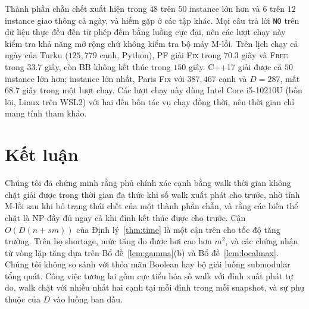 \documentclass[pdflatex,sn-mathphys-num]{sn-jnl}
\theoremstyle{thmstyleone}
\theoremstyle{thmstyletwo}
\theoremstyle{thmstylethree}
\newcommand{\FIX}{\textup{\textsc{Fix}}}
\newcommand{\FREE}{\textup{\textsc{Free}}}
\newcommand{\NO}{\texttt{NO}}
\begin{document}
Thành phần chẵn chết xuất hiện trong $48$ trên $50$ instance lớn hơn và $6$ trên $12$ instance giao thông cả ngày, và hiếm gặp ở các tập khác. Mọi câu trả lời \NO{} trên dữ liệu thực đều đến từ phép đếm bằng luồng cực đại, nên các lượt chạy này kiểm tra khả năng mở rộng chứ không kiểm tra bộ máy M-lồi. Trên lịch chạy cả ngày của Turku ($125{,}779$ cạnh, Python), PF giải \FIX{} trong $70.3$ giây và \FREE{} trong $33.7$ giây, còn BB không kết thúc trong $150$ giây. C++17 giải được cả $50$ instance lớn hơn; instance lớn nhất, Paris \FIX{} với $387{,}467$ cạnh và $D=287$, mất $68.7$ giây trong một lượt chạy. Các lượt chạy này dùng Intel Core i5-10210U (bốn lõi, Linux trên WSL2) với hai đến bốn tác vụ chạy đồng thời, nên thời gian chỉ mang tính tham khảo.

\FloatBarrier

\section{Kết luận}\label{sec:conclusion}

Chúng tôi đã chứng minh rằng phủ chính xác cạnh bằng walk thời gian không chặt giải được trong thời gian đa thức khi số walk xuất phát cho trước, nhờ tính M-lồi sau khi bỏ trạng thái chết của một thành phần chẵn, và rằng các biến thể chặt là NP-đầy đủ ngay cả khi đỉnh kết thúc được cho trước. Cận $O(D(n+sm))$ của Định lý~\ref{thm:time} là một cận trên cho tốc độ tăng trưởng. Trên họ shortage, mức tăng đo được hơi cao hơn $m^2$, và các chứng nhận từ vòng lặp tăng dựa trên Bổ đề~\ref{lem:gamma}(b) và Bổ đề~\ref{lem:localmax}. Chúng tôi không so sánh với thỏa mãn Boolean hay bộ giải luồng submodular tổng quát. Công việc tương lai gồm cực tiểu hóa số walk với đỉnh xuất phát tự do, walk chặt với nhiều nhất hai cạnh tại mỗi đỉnh trong mỗi snapshot, và sự phụ thuộc của $D$ vào luồng ban đầu.

\backmatter
\end{document}
